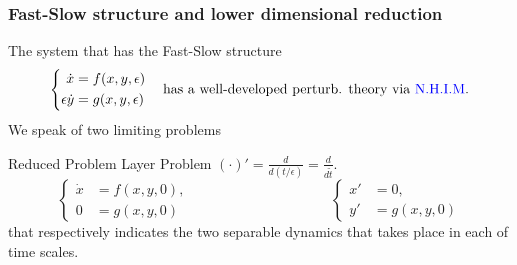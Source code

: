 \documentclass{beamer}
\def\blue{\color{blue}}
\begin{document}
\begin{frame}
 \frametitle{Fast-Slow structure and lower dimensional reduction}
 The system that has the {\blue Fast-Slow} structure 
\begin{equation*} %
 \left\{
 \begin{aligned}
  \dot{x}&=f(x,y,\epsilon)\\
  \epsilon\dot{y}&=g(x,y,\epsilon)
 \end{aligned}\right. \quad \text{has a well-developed perturb. theory via {\blue N.H.I.M}.}
\end{equation*}
  We speak of two limiting problems
  
  {\footnotesize
    \hspace{3em} {Reduced Problem} \hspace{7em} Layer Problem $(\cdot)' = \frac{d}{d(t/\epsilon)} = \frac{d}{d\tilde{t}}.$
\begin{equation*} %
 \left\{
 \begin{aligned}
    \dot{x} &= f(x,y,0),\\
    0&= g(x,y,0)
 \end{aligned}\right.
 \hspace{10em}  
 \left\{
 \begin{aligned}
    x'&= 0,\\
    y'&= g(x,y,0)
 \end{aligned}\right.
\end{equation*}
}
that respectively indicates the two separable dynamics that takes place in each of time scales.
\end{frame}
\end{document}
